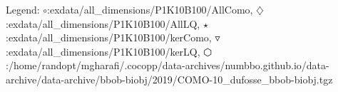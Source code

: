 Legend: {\color{NavyBlue}$\circ$}:exdata/all\_dimensions/P1K10B100/AllComo, {\color{Magenta}$\diamondsuit$}:exdata/all\_dimensions/P1K10B100/AllLQ, {\color{Orange}$\star$}:exdata/all\_dimensions/P1K10B100/kerComo, {\color{CornflowerBlue}$\triangledown$}:exdata/all\_dimensions/P1K10B100/kerLQ, {\color{red}$\varhexagon$}:/home/randopt/mgharafi/.cocopp/data-archives/numbbo.github.io/data-archive/data-archive/bbob-biobj/2019/COMO-10\_dufosse\_bbob-biobj.tgz